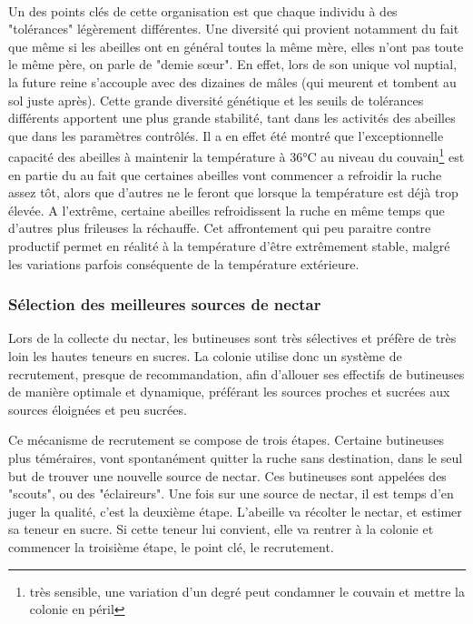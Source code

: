\documentclass[11pt,a4paper]{report}
\begin{document}
			\paragraph{}			
			Un des points clés de cette organisation est que chaque individu à des "tolérances" légèrement différentes. Une diversité qui provient notamment du fait que même si les abeilles ont en général toutes la même mère, elles n'ont pas toute le même père, on parle de "demie sœur". En effet, lors de son unique vol nuptial, la future reine s'accouple avec des dizaines de mâles (qui meurent et tombent au sol juste après). Cette grande diversité génétique et les seuils de tolérances différents apportent une plus grande stabilité, tant dans les activités des abeilles que dans les paramètres contrôlés. Il a en effet été montré que l'exceptionnelle capacité des abeilles à maintenir la température à 36°C au niveau du couvain\footnote{très sensible, une variation d'un degré peut condamner le couvain et mettre la colonie en péril} est en partie du au fait que certaines abeilles vont commencer a refroidir la ruche assez tôt, alors que d'autres ne le feront que lorsque la température est déjà trop élevée. A l'extrême, certaine abeilles refroidissent la ruche en même temps que d'autres plus frileuses la réchauffe. Cet affrontement qui peu paraitre contre productif permet en réalité à la température d'être extrêmement stable, malgré les variations parfois conséquente de la température extérieure.
			
			\subsubsection{Sélection des meilleures sources de nectar}
			Lors de la collecte du nectar, les butineuses sont très sélectives et préfère de très loin les hautes teneurs en sucres. La colonie utilise donc un système de recrutement, presque de recommandation, afin d'allouer ses effectifs de butineuses de manière optimale et dynamique, préférant les sources proches et sucrées aux sources éloignées et peu sucrées.
			
			Ce mécanisme de recrutement se compose de trois étapes. Certaine butineuses plus téméraires, vont spontanément quitter la ruche sans destination, dans le seul but de trouver une nouvelle source de nectar. Ces butineuses sont appelées des "scouts", ou des "éclaireurs". Une fois sur une source de nectar, il est temps d'en juger la qualité, c'est la deuxième étape. L'abeille va récolter le nectar, et estimer sa teneur en sucre. Si cette teneur lui convient, elle va rentrer à la colonie et commencer la troisième étape, le point clé, le recrutement.
			
\end{document}
